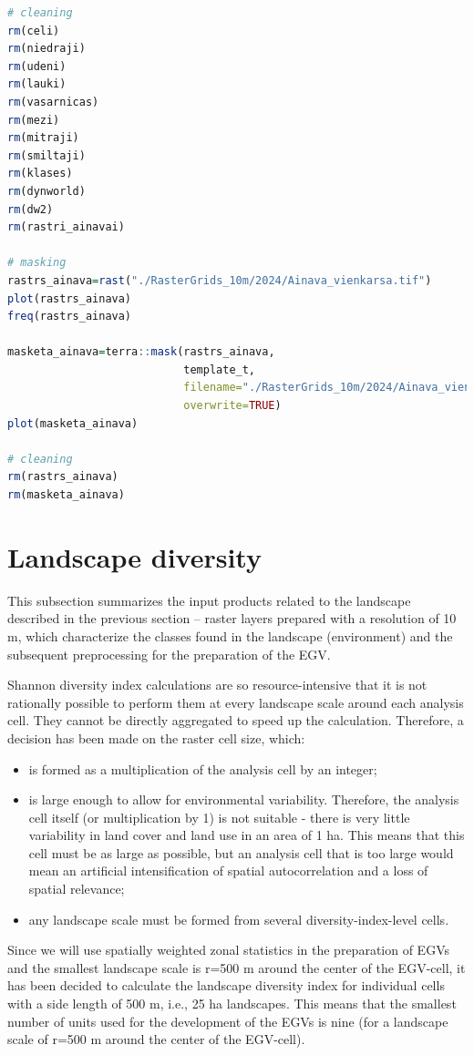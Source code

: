 \documentclass[
]{book}
\begin{document}
\begin{lstlisting}[language=R]
# cleaning
rm(celi)
rm(niedraji)
rm(udeni)
rm(lauki)
rm(vasarnicas)
rm(mezi)
rm(mitraji)
rm(smiltaji)
rm(klases)
rm(dynworld)
rm(dw2)
rm(rastri_ainavai)

# masking
rastrs_ainava=rast("./RasterGrids_10m/2024/Ainava_vienkarsa.tif")
plot(rastrs_ainava)
freq(rastrs_ainava)

masketa_ainava=terra::mask(rastrs_ainava,
                           template_t,
                           filename="./RasterGrids_10m/2024/Ainava_vienk_mask.tif",
                           overwrite=TRUE)
plot(masketa_ainava)

# cleaning
rm(rastrs_ainava)
rm(masketa_ainava)
\end{lstlisting}

\section{Landscape diversity}\label{Ch05.04}

This subsection summarizes the input products related to the landscape described
in the previous section -- raster layers prepared with a resolution of 10 m, which
characterize the classes found in the landscape (environment) and the subsequent
preprocessing for the preparation of the EGV.

Shannon diversity index calculations are so resource-intensive that it is not
rationally possible to perform them at every landscape scale around each analysis
cell. They cannot be directly aggregated to speed up the calculation. Therefore,
a decision has been made on the raster cell size, which:

\begin{itemize}
\item
  is formed as a multiplication of the analysis cell by an integer;
\item
  is large enough to allow for environmental variability. Therefore, the analysis
  cell itself (or multiplication by 1) is not suitable - there is very little
  variability in land cover and land use in an area of 1 ha. This means that this
  cell must be as large as possible, but an analysis cell that is too large would
  mean an artificial intensification of spatial autocorrelation and a loss of
  spatial relevance;
\item
  any landscape scale must be formed from several diversity-index-level cells.
\end{itemize}

Since we will use spatially weighted zonal statistics in the preparation of EGVs
and the smallest landscape scale is r=500 m around the center of the EGV-cell,
it has been decided to calculate the landscape diversity index for individual cells
with a side length of 500 m, i.e., 25 ha landscapes. This means that the
smallest number of units used for the development of the EGVs is nine (for a
landscape scale of r=500 m around the center of the EGV-cell).
\end{document}
